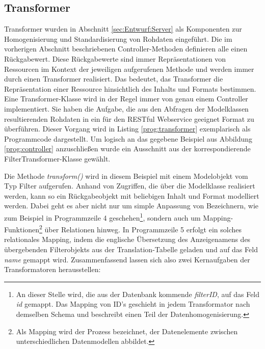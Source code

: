 \subsection{Transformer}
\label{sec:imp:Transformer}

Transformer wurden in Abschnitt \ref{sec:Entwurf:Server} als Komponenten zur Homogenisierung und Standardisierung von Rohdaten eingeführt. Die im vorherigen Abschnitt beschriebenen Controller-Methoden definieren alle einen Rückgabewert. Diese Rückgabewerte sind immer Repräsentationen von Ressourcen im Kontext der jeweiligen aufgerufenen Methode und werden immer durch einen Transformer realisiert. Das bedeutet, das Transformer die Repräsentation einer Ressource hinsichtlich des Inhalts und Formats bestimmen. Eine Transformer-Klasse wird in der Regel immer von genau einem Controller implementiert. Sie haben die Aufgabe, die aus den Abfragen der Modelklassen resultierenden Rohdaten in ein für den RESTful Webservice geeignet Format zu überführen. Dieser Vorgang wird in Listing 
\ref{prog:transformer} exemplarisch als Programmcode dargestellt. Um logisch an das gegebene Beispiel aus Abbildung \ref{prog:controller} anzuschließen wurde ein Ausschnitt aus der korrespondierende FilterTransformer-Klasse gewählt. 

\begin{program}[H]
\label{prog:transformer}
\end{program}

Die Methode \emph{transform()} wird in diesem Beispiel mit einem Modelobjekt vom Typ Filter aufgerufen. Anhand von Zugriffen, die über die Modelklasse realisiert werden, kann so ein Rückgabeobjekt mit beliebigen Inhalt und Format modelliert werden. Dabei geht es aber nicht nur um simple Anpassung von Bezeichnern, wie zum Beispiel in Programmzeile 4 geschehen\footnote{An dieser Stelle wird, die aus der Datenbank kommende \emph{filterID}, auf das Feld \emph{id} gemappt. Das Mapping von ID's geschieht in jedem Transformator nach demselben Schema und beschreibt einen Teil der Datenhomogenisierung.}, sondern auch um Mapping-Funktionen\footnote{Als Mapping wird der Prozess bezeichnet, der Datenelemente zwischen unterschiedlichen Datenmodellen abbildet.} über Relationen hinweg. In Programmzeile 5 erfolgt ein solches relationales Mapping, indem die englische Übersetzung des Anzeigenamens des übergebenden Filterobjekts aus der Translation-Tabelle geladen und auf das Feld \emph{name} gemappt wird. Zusammenfassend lassen sich also zwei Kernaufgaben der Transformatoren herausstellen:

